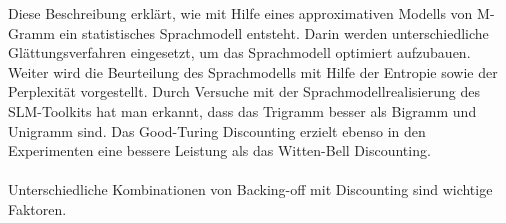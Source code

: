 Diese Beschreibung erkl\"art, wie mit Hilfe eines approximativen Modells von M-Gramm ein statistisches Sprachmodell entsteht. Darin werden unterschiedliche Gl\"attungsverfahren eingesetzt, um das Sprachmodell optimiert aufzubauen. Weiter wird die Beurteilung des Sprachmodells mit Hilfe der Entropie sowie der Perplexit\"at vorgestellt.
Durch Versuche mit der Sprachmodellrealisierung des SLM-Toolkits hat man erkannt, dass das Trigramm besser als Bigramm und Unigramm sind. Das Good-Turing Discounting erzielt ebenso in den Experimenten eine bessere Leistung als das Witten-Bell Discounting. 
\\
\\
Unterschiedliche Kombinationen von Backing-off mit Discounting sind wichtige Faktoren.

